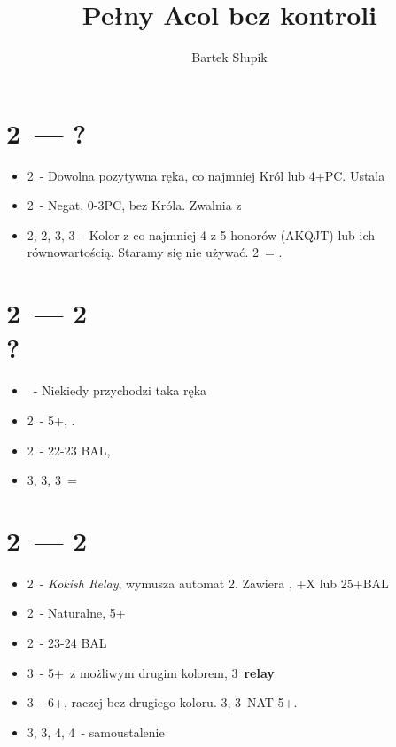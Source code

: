 \documentclass[12pt, a4paper]{article}
\title{Pełny Acol bez kontroli}
\author{Bartek Słupik}
\begin{document}
    \maketitle

    \section*{2\clubs\ --- ?}
    \begin{itemize}
        \item 2\diams\ - Dowolna pozytywna ręka, co najmniej Król lub 4+PC. Ustala \gf
        \item 2\hearts\ - Negat, 0-3PC, bez Króla. Zwalnia z \gf
        \br
        \item 2\spades, 2\nt, 3\clubs, 3\diams\ - Kolor z co najmniej 4 z 5 honorów (AKQJT) lub ich równowartością.
        Staramy się nie używać. 2\nt\ = \hearts.
    \end{itemize}

    \section*{2\clubs\ --- 2\hearts \\ ?}
    \begin{itemize}
        \item \pass\ - Niekiedy przychodzi taka ręka 
        \item 2\spades\ - 5+\spades, \fonce.
        \item 2\nt\ - 22-23 BAL, \nf
        \item 3\clubs, 3\diams, 3\hearts\ = \gf
    \end{itemize}

    \pagebreak
    \section*{2\clubs\ --- 2\diams}
    \begin{itemize}
        \item 2\hearts\ - \emph{Kokish Relay}, wymusza automat 2\spades. Zawiera \hearts, \hearts+X lub 25+BAL 
        \item 2\spades\ - Naturalne, 5+\spades 
        \item 2\nt\ - 23-24 BAL
        \br
        \item 3\clubs\ - 5+\clubs\ z możliwym drugim kolorem, 3\diams\ \textbf{relay}
        \item 3\diams\ - 6+\diams, raczej bez drugiego koloru. 3\hearts, 3\spades\ NAT 5+.
        \item 3\hearts, 3\spades, 4\clubs, 4\diams\ - samoustalenie
    \end{itemize}
\end{document}
